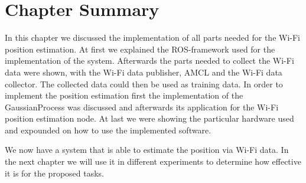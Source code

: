 \section{Chapter Summary}
In this chapter we discussed the implementation of all parts needed for the Wi-Fi position estimation. At first we explained the ROS-framework used for the implementation of the system. Afterwards the parts needed to collect the Wi-Fi data were shown, with the Wi-Fi data publisher, AMCL and the Wi-Fi data collector. The collected data could then be used as training data. In order to implement the position estimation first the implementation of the \Gls{GaussianProcess} was discussed and afterwards its application for the Wi-Fi position estimation node. At last we were showing the particular hardware used and expounded on how to use the implemented software. 

We now have a system that is able to estimate the position via Wi-Fi data. In the next chapter we will use it in different experiments to determine how effective it is for the proposed tasks. 